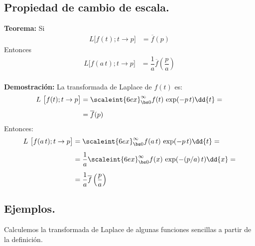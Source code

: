 \subsection{Propiedad de cambio de escala.}

\noindent \textbf{Teorema: } Si
\begin{align*}
L \big[f(t); t \to p\big] &= \overline{f} (p)
\end{align*}
Entonces
\begin{align*}
L \big[f(a \, t); t \to p\big] &= \dfrac{1}{a}\overline{f} \left(\dfrac{p}{a}\right)
\end{align*}
\\[0.5em]
\textbf{Demostración: } La transformada de Laplace de $f(t)$ es:
\begin{align*}
L \big[f(t); t \to p\big] &= \scaleint{6ex}_{\bs 0}^{\infty} f(t) \, \exp(-p \, t) \dd{t} = \\[0.5em]
&= \overline{f} (p)
\end{align*}
Entonces:
\begin{align}
\begin{aligned}
L \big[f(a \, t); t \to p\big] &= \scaleint{6ex}_{\bs 0}^{\infty} f(a \, t) \, \exp(-p \, t) \dd{t} = \\[0.5em]
&= \dfrac{1}{a} \scaleint{6ex}_{\bs 0}^{\infty} f(x) \, \exp(- (p/a) \, t) \dd{x} = \\[0.5em]
&= \dfrac{1}{a}\overline{f} \left(\dfrac{p}{a}\right)
\end{aligned}
\label{eq:ecuacion_03_09}
\end{align}

\subsection*{Ejemplos.}

Calculemos la transformada de Laplace de algunas funciones sencillas a partir de la definición.


